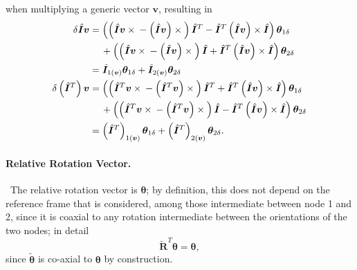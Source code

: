 \documentclass[10pt,dvips,fleqn,subeqn]{report}
\newcommand{\T}[1]{\bm{#1}}
\newcommand{\TT}[1]{\bm{#1}}
\begin{document}
when multiplying a generic vector $\T{v}$, resulting in
\begin{subequations}
\begin{align}
	\delta\hat{\T{I}} \T{v}
	&= \plbr{
		\plbr{
			\hat{\T{I}} \T{v} \times{}
			- \plbr{\hat{\T{I}} \T{v}} \times{}
		} \hat{\T{I}}^T
		- \hat{\T{I}}^T \plbr{\hat{\T{I}} \T{v}} \times \hat{\T{I}}
	} \T{\theta}_{1\delta}
		\nonumber \\
	& \mbox{\hspace{12pt}} + \plbr{
		\plbr{
			\hat{\T{I}} \T{v} \times{}
			- \plbr{\hat{\T{I}} \T{v}} \times{}
		} \hat{\T{I}}
		+ \hat{\T{I}}^T \plbr{\hat{\T{I}} \T{v}} \times \hat{\T{I}}
	} \T{\theta}_{2\delta}
		\nonumber \\
	&= \hat{\TT{I}}_{1\plbr{\T{v}}} \T{\theta}_{1\delta}
		+ \hat{\TT{I}}_{2\plbr{\T{v}}} \T{\theta}_{2\delta} \\
	\delta\plbr{\hat{\T{I}}^T} \T{v}
	&= \plbr{
		\plbr{
			\hat{\T{I}}^T \T{v} \times{}
			- \plbr{\hat{\T{I}}^T \T{v}} \times{}
		} \hat{\T{I}}^T
		+ \hat{\T{I}}^T \plbr{\hat{\T{I}} \T{v}} \times \hat{\T{I}}
	} \T{\theta}_{1\delta}
		\nonumber \\
	& \mbox{\hspace{12pt}} + \plbr{
		\plbr{
			\hat{\T{I}}^T \T{v} \times{}
			- \plbr{\hat{\T{I}}^T \T{v}} \times{}
		} \hat{\T{I}}
		- \hat{\T{I}}^T \plbr{\hat{\T{I}} \T{v}} \times \hat{\T{I}}
	} \T{\theta}_{2\delta}
		\nonumber \\
	&= \plbr{\hat{\TT{I}}^T}_{1\plbr{\T{v}}} \T{\theta}_{1\delta}
		+ \plbr{\hat{\TT{I}}^T}_{2\plbr{\T{v}}} \T{\theta}_{2\delta} .
\end{align}
\end{subequations}


\paragraph{Relative Rotation Vector.} \
The relative rotation vector is $\T{\theta}$; by definition, this does not depend
on the reference frame that is considered, among those intermediate 
between node 1 and 2, since it is coaxial to any rotation intermediate 
between the orientations of the two nodes; in detail
\begin{equation}
	\tilde{\T{R}}^T \T{\theta} = \T{\theta} ,
\end{equation}
since $\tilde{\T{\theta}}$ is co-axial to $\T{\theta}$
by construction.
\end{document}
